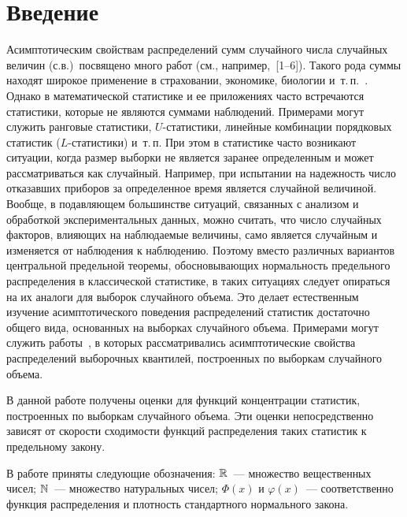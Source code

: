       \begin{multicols}{2}

            \label{st\stat}



\section{Введение}

Асимптотическим свойствам распределений сумм случайного числа
случайных величин (с.в.)\ посвящено много работ (см., например,~[1--6]).
Такого рода суммы находят широкое применение в страховании,
экономике, биологии и~т.\,п.~\cite{3-ben, 5-ben, 6-ben}. Однако в математической
статистике и ее приложениях часто встречаются статистики, которые не
являются  суммами наблюдений. Примерами могут служить ранговые
статистики, $U$-ста\-ти\-сти\-ки, линейные комбинации порядковых статистик\linebreak
($L$-ста\-ти\-сти\-ки) и~т.\,п. При этом в статистике час\-то возникают
ситуации, когда размер выборки не является заранее определенным и
может рас\-смат\-ри\-вать\-ся как случайный. Например, при испытании на
надежность число отказавших приборов за определенное время является
случайной величиной. Вообще, в подавляющем большинстве ситуаций,
связанных с анализом и обработкой экспериментальных данных, можно
считать, что число случайных факторов, влияющих на наблюдаемые
величины, само является случайным и изменяется от наблюдения к
наблюдению. Поэтому вместо различных вариантов центральной
предельной теоремы, обосновывающих нормальность предельного
распределения в классической статистике, в таких ситуациях следует
опираться на их аналоги для выборок случайного объема. Это делает
естественным изучение асимптотического поведения распределений
статистик достаточно общего вида, основанных на выборках случайного
объема. Примерами могут служить работы~\cite{7-ben, 8-ben}, в которых
рассматривались асимптотические свойства распределений выборочных
квантилей, построенных по выборкам случайного объема.

В данной работе получены оценки для  функций концентрации статистик,
построенных по выборкам случайного объема. Эти оценки
непосредственно зависят от скорости сходимости функций распределения
таких статистик к предельному закону.

В работе приняты следующие обозначения: $\mathbb{R}$~--- множество
вещественных чисел; $\mathbb N$~--- множество натуральных чисел; $\Phi(x)$ и
$\varphi(x)$~--- соответственно функция распределения  и плотность
стандартного нормального закона.


\end{multicols}
